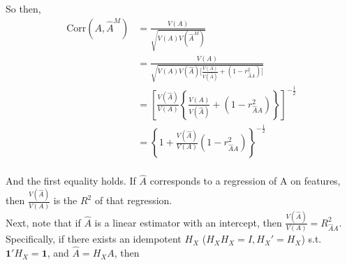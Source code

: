 \documentclass[40pt]{article}
\begin{document}


So then, 
\begin{align*}
\textrm{Corr}(A, \hat{A}^M) &= \frac{V(A)}{\sqrt{V(A)V(\hat{A}^M)}}  \\
&= \frac{V(A)}{\sqrt{V(A)V(\hat{A})\Big[ \frac{V(A)}{V(\hat{A})} + (1 - r_{\hat{A}A}^2)\Big]}} \\
&=  \left[\frac{V(\hat{A})}{V(A)} \left\{\frac{V(A)}{V(\hat{A})} + (1 - r_{\hat{A}A}^2) \right\} \right]^{-\frac{1}{2}} \\
&= \left\{1 + \frac{V(\hat{A})}{V(A)}(1 - r_{\hat{A}A}^2) \right\}^{-\frac{1}{2}} \\
\end{align*}

And the first equality holds. If $\hat{A}$ corresponds to a regression of A on features, then $\frac{V(\hat{A})}{V(A)}$ is the $R^2$ of that regression. \\




Next, note that if $\hat{A}$ is a linear estimator with an intercept, then $\frac{V(\hat{A})}{V(A)} = R_{\hat{A}A}^2$. Specifically, if there exists an idempotent $H_X$ ($H_XH_X=I, H_X'=H_X$) s.t. $\pmb{1}'H_X = \pmb{1}$, and $\hat{A} = H_XA$, then \\
\end{document}
